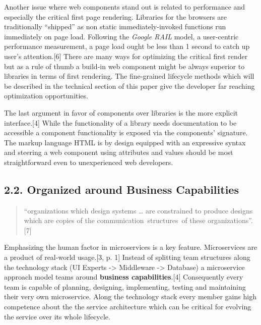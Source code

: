 \documentclass[]{article}
\begin{document}
Another issue where web components stand out is related to performance
and especially the critical first page rendering. Libraries for the
browsers are traditionally ``shipped'' as non static immediately-invoked
functions run immediately on page load. Following the \emph{Google RAIL}
model, a user-centric performance measurement, a page load ought be less
than 1 second to catch up user's attention.{[}6{]} There are many ways
for optimizing the critical first render but as a rule of thumb a
build-in web component might be always superior to libraries in terms of
first rendering. The fine-grained lifecycle methods which will be
described in the technical section of this paper give the developer far
reaching optimization opportunities.

The last argument in favor of components over libraries is the more
explicit interface.{[}4{]} While the functionality of a library needs
documentation to be accessible a component functionality is exposed via
the components' signature. The markup language HTML is by design
equipped with an expressive syntax and steering a web component using
attributes and values should be most straightforward even to
unexperienced web developers.

\subsection{2.2. Organized around Business
Capabilities}\label{organized-around-business-capabilities}

\begin{quote}
``organizations which design systems \ldots{} are constrained to produce
designs which are copies of the communication~structures~of these
organizations''. {[}7{]}
\end{quote}

Emphasizing the human factor in microservices is a key feature.
Microservices are a product of real-world usage.{[}3, p. 1{]} Instead of
splitting team structures along the technology stack (UI Experts
-\textgreater{} Middleware -\textgreater{} Database) a microservice
approach model teams around \textbf{business capabilities}.{[}4{]}
Consequently every team is capable of planning, designing, implementing,
testing and maintaining their very own microservice. Along the
technology stack every member gains high competence about the the
service architecture which can be critical for evolving the service over
its whole lifecycle.
\end{document}
